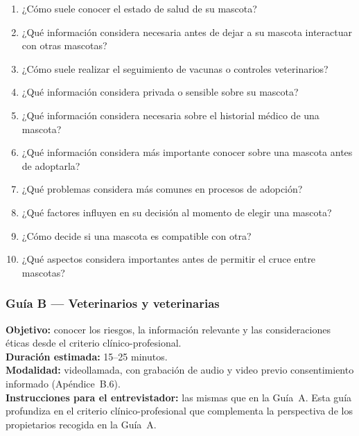 \documentclass[journal,onecolumn]{IEEEtran}
\begin{document}
	\begin{enumerate}[leftmargin=*, itemsep=1pt]
		\item ¿Cómo suele conocer el estado de salud de su mascota?
		\item ¿Qué información considera necesaria antes de dejar a su mascota interactuar con otras mascotas?
		\item ¿Cómo suele realizar el seguimiento de vacunas o controles veterinarios?
		\item ¿Qué información considera privada o sensible sobre su mascota?
		\item ¿Qué información considera necesaria sobre el historial médico de una mascota?
		\item ¿Qué información considera más importante conocer sobre una mascota antes de adoptarla?
		\item ¿Qué problemas considera más comunes en procesos de adopción?
		\item ¿Qué factores influyen en su decisión al momento de elegir una mascota?
		\item ¿Cómo decide si una mascota es compatible con otra?
		\item ¿Qué aspectos considera importantes antes de permitir el cruce entre mascotas?
	\end{enumerate}
	
	\subsubsection*{Guía B --- Veterinarios y veterinarias}
	
	\textbf{Objetivo:} conocer los riesgos, la información relevante y las
	consideraciones éticas desde el criterio clínico-profesional.\\
	\textbf{Duración estimada:} 15--25 minutos.\\
	\textbf{Modalidad:} videollamada, con grabación de audio y video previo
	consentimiento informado (Apéndice~B.6).\\
	\textbf{Instrucciones para el entrevistador:} las mismas que en la Guía~A. Esta
	guía profundiza en el criterio clínico-profesional que complementa la perspectiva
	de los propietarios recogida en la Guía~A.
	
\end{document}
